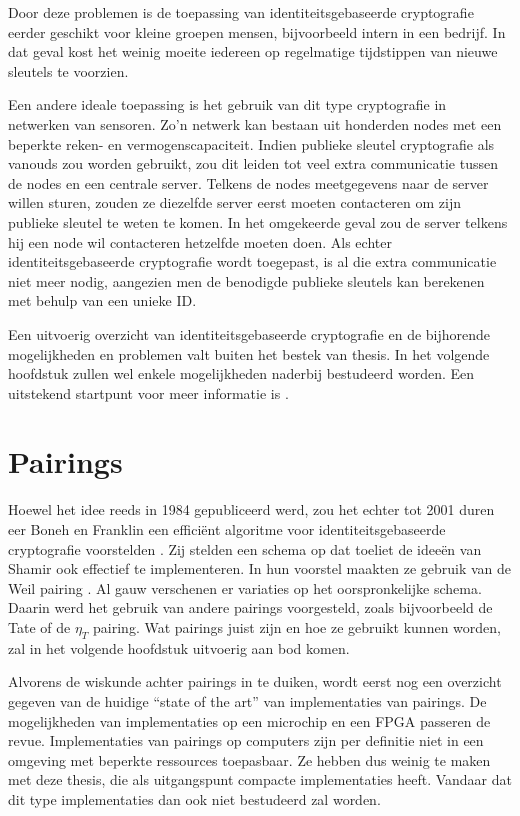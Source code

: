 Door deze problemen is de toepassing van identiteitsgebaseerde cryptografie eerder geschikt voor kleine groepen mensen, bijvoorbeeld intern in een bedrijf. In dat geval kost het weinig moeite iedereen op regelmatige tijdstippen van nieuwe sleutels te voorzien.

Een andere ideale toepassing is het gebruik van dit type cryptografie in netwerken van sensoren. Zo'n netwerk kan bestaan uit honderden nodes met een beperkte reken- en vermogenscapaciteit. Indien publieke sleutel cryptografie als vanouds zou worden gebruikt, zou dit leiden tot veel extra communicatie tussen de nodes en een centrale server. Telkens de nodes meetgegevens naar de server willen sturen, zouden ze diezelfde server eerst moeten contacteren om zijn publieke sleutel te weten te komen. In het omgekeerde geval zou de server telkens hij een node wil contacteren hetzelfde moeten doen.  Als echter identiteitsgebaseerde cryptografie wordt toegepast, is al die extra communicatie niet meer nodig, aangezien men de benodigde publieke sleutels kan berekenen met behulp van een unieke ID.

Een uitvoerig overzicht van identiteitsgebaseerde cryptografie en de bijhorende mogelijkheden en problemen valt buiten het bestek van thesis. In het volgende hoofdstuk zullen wel enkele mogelijkheden naderbij bestudeerd worden. Een uitstekend startpunt voor meer informatie is \cite{maas}.

\section{Pairings\label{inleiding-pairings}}

Hoewel het idee reeds in 1984 gepubliceerd werd, zou het echter tot 2001 duren eer Boneh en Franklin een effici\"ent algoritme voor identiteitsgebaseerde cryptografie voorstelden \cite{boneh}. Zij stelden een schema op dat toeliet de idee\"en van Shamir ook effectief te implementeren. In hun voorstel maakten ze gebruik van de Weil pairing \cite{weil}. Al gauw verschenen er variaties op het oorspronkelijke schema. Daarin werd het gebruik van andere pairings voorgesteld, zoals bijvoorbeeld de Tate \cite{tate} of de $\eta_T$ \cite{eta} pairing. Wat pairings juist zijn en hoe ze gebruikt kunnen worden, zal in het volgende hoofdstuk uitvoerig aan bod komen.

Alvorens de wiskunde achter pairings in te duiken, wordt eerst nog een overzicht gegeven van de huidige ``state of the art'' van implementaties van pairings. De mogelijkheden van implementaties op een microchip en een FPGA passeren de revue. Implementaties van pairings op computers zijn per definitie niet in een omgeving met beperkte ressources toepasbaar. Ze hebben dus weinig te maken met deze thesis, die als uitgangspunt compacte implementaties heeft. Vandaar dat dit type implementaties dan ook niet bestudeerd zal worden.

